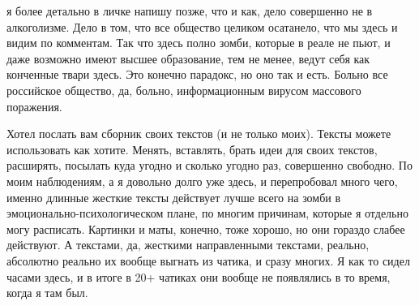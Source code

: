 я более детально в личке напишу позже, что и как, дело совершенно не в
алкоголизме. Дело в том, что все общество целиком осатанело, что мы здесь и
видим по комментам. Так что здесь полно зомби, которые в реале не пьют, и даже
возможно имеют высшее образование, тем не менее, ведут себя как конченные твари
здесь. Это конечно парадокс, но оно так и есть. Больно все российское общество,
да, больно, информационным вирусом массового поражения.


Хотел послать вам сборник своих текстов (и не только моих). Тексты можете
использовать как хотите. Менять, вставлять, брать идеи для своих текстов,
расширять, посылать куда угодно и сколько угодно раз, совершенно свободно. По
моим наблюдениям, а я довольно долго уже здесь, и перепробовал много чего,
именно длинные жесткие тексты действует лучше всего на зомби в
эмоционально-психологическом плане, по многим причинам, которые я отдельно могу
расписать. Картинки и маты, конечно, тоже хорошо, но они гораздо слабее
действуют. А текстами, да, жесткими направленными текстами, реально, абсолютно
реально их вообще выгнать из чатика, и сразу многих. Я как то сидел часами
здесь, и в итоге в 20+ чатиках они вообще не появлялись в то время, когда я там
был.




